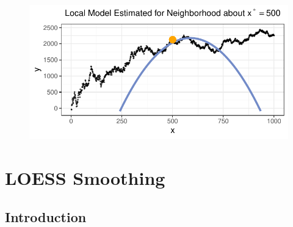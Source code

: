 \documentclass[12pt,twoside]{smiththesis}
\begin{document}
\begin{figure}

{\centering \includegraphics[width=1\linewidth]{thesis_files/figure-latex/unnamed-chunk-27-1} 

}

\caption{\label{fig:trunc}}\label{fig:unnamed-chunk-27}
\end{figure}
\newpage

\hypertarget{loess-smoothing}{%
\section{LOESS Smoothing}\label{loess-smoothing}}

\hypertarget{introduction-1}{%
\subsection{Introduction}\label{introduction-1}}
\end{document}
